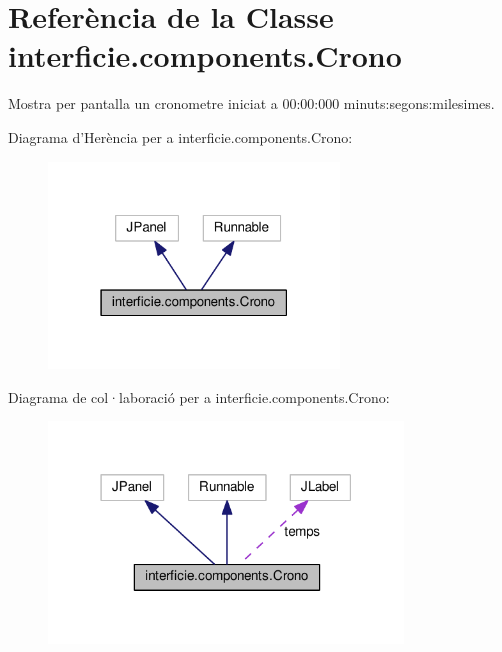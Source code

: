 \hypertarget{classinterficie_1_1components_1_1_crono}{\section{Referència de la Classe interficie.\+components.\+Crono}
\label{classinterficie_1_1components_1_1_crono}
}


Mostra per pantalla un cronometre iniciat a 00\+:00\+:000 minuts\+:segons\+:milesimes.  




Diagrama d'Herència per a interficie.\+components.\+Crono\+:\nopagebreak
\begin{figure}[H]
\begin{center}
\leavevmode
\includegraphics[width=219pt]{classinterficie_1_1components_1_1_crono__inherit__graph}
\end{center}
\end{figure}


Diagrama de col·laboració per a interficie.\+components.\+Crono\+:\nopagebreak
\begin{figure}[H]
\begin{center}
\leavevmode
\includegraphics[width=267pt]{classinterficie_1_1components_1_1_crono__coll__graph}
\end{center}
\end{figure}
